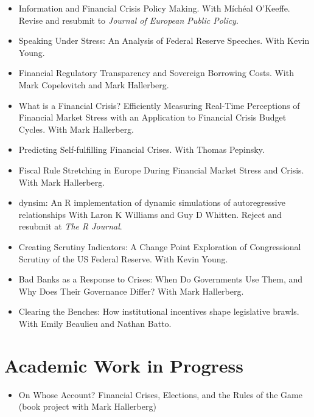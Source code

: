 \documentclass[a4paper]{article}
\begin{document}
{\begin{itemize}
    \item Information and Financial Crisis Policy Making. With M\'{i}ch\'{e}al O'Keeffe. Revise and resubmit to \emph{Journal of European Public Policy}.

    \item Speaking Under Stress: An Analysis of Federal Reserve Speeches. With Kevin Young.

    \item Financial Regulatory Transparency and Sovereign Borrowing Costs. With Mark Copelovitch and Mark Hallerberg.

    \item What is a Financial Crisis? Efficiently Measuring Real-Time Perceptions of Financial Market Stress with an Application to Financial Crisis Budget Cycles. With Mark Hallerberg.

    \item Predicting Self-fulfilling Financial Crises. With Thomas Pepinsky.

    \item Fiscal Rule Stretching in Europe During Financial Market Stress and Crisis. With Mark Hallerberg.

    \item dynsim: An R implementation of dynamic simulations of autoregressive relationships With Laron K Williams and Guy D Whitten. Reject and resubmit at \emph{The R Journal}.

    \item Creating Scrutiny Indicators: A Change Point Exploration of Congressional Scrutiny of the US Federal Reserve. With Kevin Young.

    \item Bad Banks as a Response to Crises: When Do Governments Use Them, and Why Does Their Governance Differ? With Mark Hallerberg.

    \item Clearing the Benches: How institutional incentives shape legislative brawls. With Emily Beaulieu and Nathan Batto.

\end{itemize}

\section*{Academic Work in Progress}

\begin{itemize}

    \item On Whose Account? Financial Crises, Elections, and the Rules of the Game (book project with Mark Hallerberg)


\end{itemize}}
\end{document}
